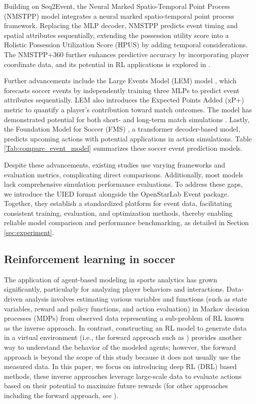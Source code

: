 Building on Seq2Event, the Neural Marked Spatio-Temporal Point Process (NMSTPP) model \citep{yeung2023transformer} integrates a neural marked spatio-temporal point process \citep{Shchur2021} framework. Replacing the MLP decoder, NMSTPP predicts event timing and spatial attributes sequentially, extending the possession utility score into a Holistic Possession Utilization Score (HPUS) by adding temporal considerations. The NMSTPP+360 \citep{yeung2023events} further enhances predictive accuracy by incorporating player coordinate data, and its potential in RL applications is explored in \citep{yeung2024unveiling}.

Further advancements include the  Large Events Model (LEM) model \citep{mendes2024towards}, which forecasts soccer events by independently training three MLPs to predict event attributes sequentially. LEM also introduces the Expected Points Added (xP+) metric to quantify a player’s contribution toward match outcomes. The model has demonstrated potential for both short- and long-term match simulations \citep{mendes2024forecasting}. Lastly, the Foundation Model for Soccer (FMS) \citep{baron2024foundation}, a transformer decoder-based model, predicts upcoming actions with potential applications in action simulations. Table \ref{Tab:compare_event_model} summarizes these soccer event prediction models.

Despite these advancements, existing studies use varying frameworks and evaluation metrics, complicating direct comparisons. Additionally, most models lack comprehensive simulation performance evaluations. To address these gaps, we introduce the UIED format alongside the OpenStarLab Event package. Together, they establish a standardized platform for event data, facilitating consistent training, evaluation, and optimization methods, thereby enabling reliable model comparison and performance benchmarking, as detailed in Section \ref{sec:experiment}.

\subsection{Reinforcement learning in soccer}
\label{ssec:related_rl_soccer}
The application of agent-based modeling in sports analytics has grown significantly, particularly for analyzing player behaviors and interactions. 
Data-driven analysis involves estimating various variables and functions (such as state variables, reward and policy functions, and action evaluation) in Markov decision processes (MDPs) from observed data representing a sub-problem of RL known as the inverse approach. In contrast, constructing an RL model to generate data in a virtual environment (i.e., the forward approach such as \cite{kurach2020google, fujii2024adaptive}) provides another way to understand the behavior of the modeled agents; however, the forward approach is beyond the scope of this study because it does not usually use the measured data. In this paper, we focus on introducing deep RL (DRL) based methods, these inverse approaches leverage large-scale data to evaluate actions based on their potential to maximize future rewards (for other approaches including the forward approach, see \cite{fujii2021data, fujii2025machine}).

